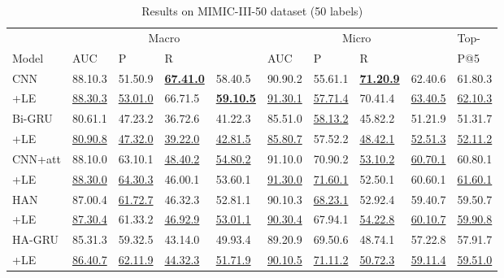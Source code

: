 \documentclass[final,5p,times,twocolumn]{elsarticle}
\begin{document}
\begin{table*}[th]
\caption{Results on MIMIC-III-50 dataset (50 labels)}\label{mimic-iii-50-results}
\footnotesize
\center
\begin{threeparttable}
\begin{tabular}{lllll|llll|l}
\cline{1-10}
                      & \multicolumn{4}{c}{Macro}                 & \multicolumn{4}{c}{Micro}                 & Top-    \\
Model                 & AUC      & P        & R        &        & AUC      & P        & R        &        & P@5      \\
\cline{1-10}
CNN                   & 88.10.3 & 51.50.9 & \textbf{\underline{67.41.0}} & 58.40.5 & 90.90.2 & 55.61.1 & \textbf{\underline{71.20.9}} & 62.40.6 & 61.80.3 \\
+LE                   & \underline{88.30.3} & \underline{53.01.0} & 66.71.5 & \textbf{\underline{59.10.5}} & \underline{91.30.1} & \underline{57.71.4} & 70.41.4 & \underline{63.40.5} & \underline{62.10.3} \\
\cline{1-10}
Bi-GRU                & 80.61.1 & 47.23.2 & 36.72.6 & 41.22.3 & 85.51.0 & \underline{58.13.2} & 45.82.2 & 51.21.9 & 51.31.7 \\
+LE                   & \underline{80.90.8} & \underline{47.32.0} & \underline{39.22.0} & \underline{42.81.5} & \underline{85.80.7} & 57.52.2 & \underline{48.42.1} & \underline{52.51.3} & \underline{52.11.2} \\
\cline{1-10}
CNN+att               & 88.10.0 & 63.10.1 & \underline{48.40.2} & \underline{54.80.2} & 91.10.0 & 70.90.2 & \underline{53.10.2} & \underline{60.70.1} & 60.80.1 \\
+LE                   & \underline{88.30.0} & \underline{64.30.3} & 46.00.1 & 53.60.1 & \underline{91.30.0} & \underline{71.60.1} & 52.50.1 & 60.60.1 & \underline{61.60.1} \\
\cline{1-10}
HAN                   & 87.00.4 & \underline{61.72.7} & 46.32.3 & 52.81.1 & 90.10.3 & \underline{68.23.1} & 52.92.4 & 59.40.7 & 59.50.7 \\
+LE                   & \underline{87.30.4} & 61.33.2 & \underline{46.92.9} & \underline{53.01.1} & \underline{90.30.4} & 67.94.1 & \underline{54.22.8} & \underline{60.10.7} & \underline{59.90.8} \\
\cline{1-10}
HA-GRU                 & 85.31.3 & 59.32.5 & 43.14.0 & 49.93.4 & 89.20.9 & 69.50.6 & 48.74.1 & 57.22.8 & 57.91.7 \\
+LE                   & \underline{86.40.7} & \underline{62.11.9} & \underline{44.32.3} & \underline{51.71.9} & \underline{90.10.5} & \underline{71.11.2} & \underline{50.72.3} & \underline{59.11.4} & \underline{59.51.0} \\

\end{tabular}
\end{threeparttable}
\end{table*}
\end{document}
